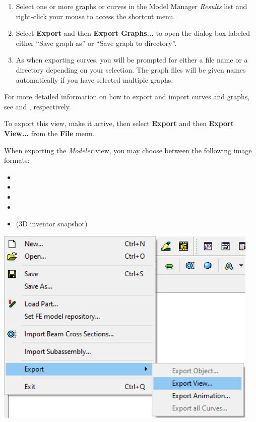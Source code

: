 \begin{enumerate}
\item Select one or more graphs or curves in the Model Manager {\sl Results}
  list and right-click your mouse to access the shortcut menu.
\item Select \textbf{Export} and then \textbf{Export Graphs...} to open the
  dialog box labeled either ``Save graph as'' or ``Save graph to directory''.
\item As when exporting curves, you will be prompted for either a file name
  or a directory depending on your selection. The graph files will be given
  names automatically if you have selected multiple graphs.
\end{enumerate}

For more detailed information on how to export and import curves and
graphs, see 
and ,
respectively.



\noindent
\begin{minipage}{0.41\textwidth}
  \setlength{\parskip}{1mm}
  \raggedright
  To export this view, make it active, then select \textbf{Export} and then
  \textbf{Export View...} from the \textbf{File} menu.

  When exporting the {\sl Modeler} view, you may choose between the following
  image formats:

  \begin{itemize}
  \item{}
  \item{}
  \item{}
  \item{}
  \item{} \small(3D inventor snapshot)
  \end{itemize}
\end{minipage}%
\begin{minipage}{0.59\textwidth}
  \raggedleft
  \includegraphics[width=0.95\textwidth]{Figures/2-ExportView}
\end{minipage}

